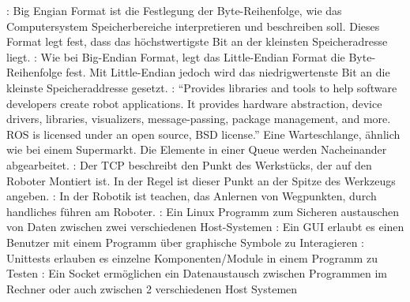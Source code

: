 \begin{acronym}
 : Big Engian Format ist die Festlegung der Byte-Reihenfolge, wie das Computersystem Speicherbereiche interpretieren und beschreiben soll. Dieses Format legt fest, dass das höchstwertigste Bit an der kleinsten Speicheradresse liegt.
 : Wie bei \acs{Big-Endian Format}, legt das Little-Endian Format die Byte-Reihenfolge fest. Mit Little-Endian jedoch wird das niedrigwertenste Bit an die kleinste Speicheraddresse gesetzt.
 : ``Provides libraries and tools to help software developers create robot applications. It provides hardware abstraction, device drivers, libraries, visualizers, message-passing, package management, and more. ROS is licensed under an open source, BSD license.'' \cite{ROSPR-2013}
  Eine Warteschlange, ähnlich wie bei einem Supermarkt. Die Elemente in einer Queue werden Nacheinander abgearbeitet. 
 : Der TCP beschreibt den Punkt des Werkstücks, der auf den Roboter Montiert ist. In der Regel ist dieser Punkt an der Spitze des Werkzeugs angeben.
 : In der Robotik ist teachen, das Anlernen von Wegpunkten, durch handliches führen am Roboter.
 : Ein Linux Programm zum Sicheren austauschen von Daten zwischen zwei verschiedenen Host-Systemen
 : Ein GUI erlaubt es einen Benutzer mit einem Programm über graphische Symbole zu Interagieren
 : Unittests erlauben es einzelne Komponenten/Module in einem Programm zu Testen
 : Ein Socket ermöglichen ein Datenaustausch zwischen Programmen im Rechner oder auch zwischen 2 verschiedenen Host Systemen
\end{acronym}
